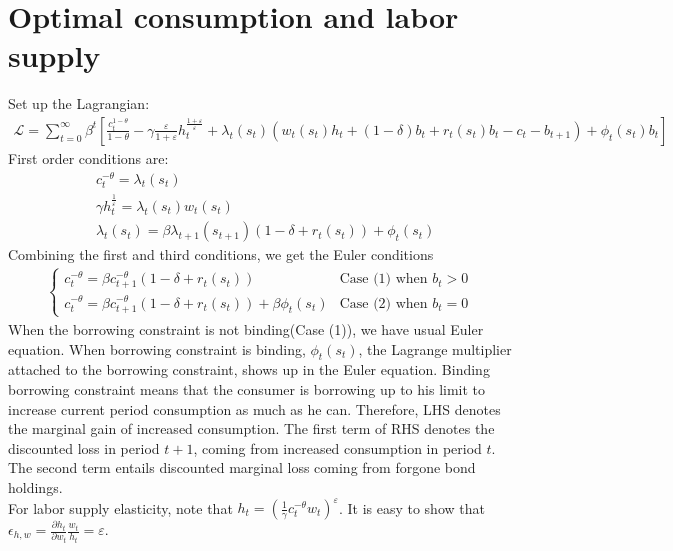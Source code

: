 \documentclass[12pt]{amsart}
\begin{document}
\section{Optimal consumption and labor supply}
Set up the Lagrangian:
\begin{align*}
\mathcal{L} = \sum_{t=0}^{\infty} \beta^t \left[  \frac{c_t^{1-\theta}}{1-\theta}  - \gamma \frac{\varepsilon}{1+\varepsilon} h_t^{\frac{1+\varepsilon}{\varepsilon}} + \lambda_t(s_t) \left( w_t(s_t) h_t + (1-\delta) b_{t} + r_t(s_t) b_{t} - c_t - b_{t+1}  \right) + \phi_t(s_t) b_t \right]
\end{align*}
First order conditions are: 
\begin{align*}
&c_t^{-\theta} = \lambda_t(s_t) \\
& \gamma h_t^{\frac{1}{\varepsilon}} = \lambda_t(s_t) w_t(s_t) \\
& \lambda_t(s_t) = \beta \lambda_{t+1}(s_{t+1}) \left( 1- \delta + r_t(s_t)  \right) + \phi_t(s_t)
\end{align*}
Combining the first and third conditions, we get the Euler conditions 
\begin{align*}
\begin{cases}
c_t^{-\theta} = \beta c_{t+1}^{-\theta} \left( 1- \delta + r_t(s_t)  \right) & \text{Case (1) when } b_t > 0 \\    
c_t^{-\theta} = \beta c_{t+1}^{-\theta} \left( 1- \delta + r_t(s_t)  \right)  +  \beta \phi_t(s_t) & \text{Case (2) when } b_t = 0    
\end{cases}
\end{align*}
When the borrowing constraint is not binding(Case (1)), we have usual Euler equation. When borrowing constraint is binding, $\phi_t(s_t)$, the Lagrange multiplier attached to the borrowing constraint, shows up in the Euler equation. Binding borrowing constraint means that the consumer is borrowing up to his limit to increase current period consumption as much as he can. Therefore, LHS denotes the marginal gain of increased consumption. The first term of RHS denotes the discounted loss in period $t+1$, coming from increased consumption in period $t$. The second term entails discounted marginal loss coming from forgone bond holdings. \\

For labor supply elasticity, note that $h_t = \left( \frac{1}{\gamma} c_t^{-\theta} w_t \right)^\varepsilon$. It is easy to show that $\epsilon_{h,w} = \frac{\partial h_t}{\partial w_t} \frac{w_t}{h_t} = \varepsilon$. 
\end{document}
